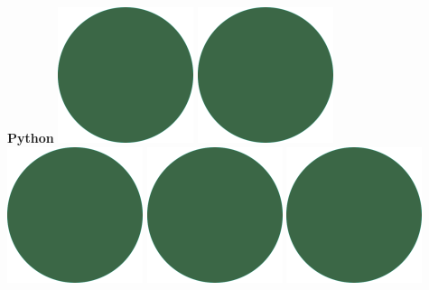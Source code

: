 \documentclass[]{commands}
\begin{document}
\begin{aside}
\textbf{Python}\hfill
\includegraphics[scale=0.11]{img/IPSGreenDots.png}
\includegraphics[scale=0.11]{img/IPSGreenDots.png}
\includegraphics[scale=0.11]{img/IPSGreenDots.png}
\includegraphics[scale=0.11]{img/IPSGreenDots.png}
\includegraphics[scale=0.11]{img/IPSGreenDots.png}


\end{aside}
\end{document}
